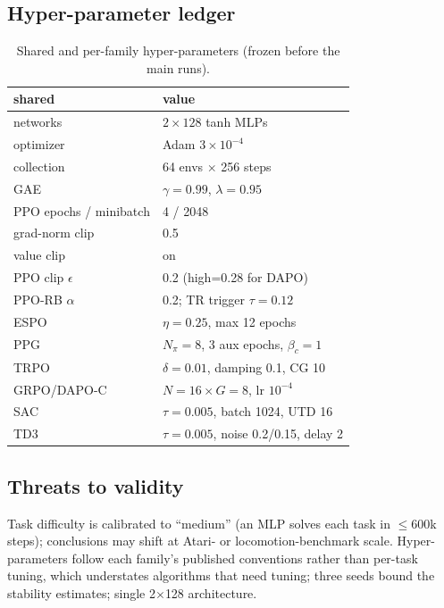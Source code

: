 \documentclass[journal,twoside]{IEEEtran}
\begin{document}
\subsection{Hyper-parameter ledger}
\begin{table}[t]
\centering\small
\caption{Shared and per-family hyper-parameters (frozen before the main
runs).}
\label{tab:hparams}
\begin{tabular}{ll}
\toprule
shared & value \\
\midrule
networks & $2{\times}128$ tanh MLPs \\
optimizer & Adam $3{\times}10^{-4}$ \\
collection & 64 envs $\times$ 256 steps \\
GAE & $\gamma=0.99$, $\lambda=0.95$ \\
PPO epochs / minibatch & 4 / 2048 \\
grad-norm clip & 0.5 \\
value clip & on \\
\midrule
PPO clip $\epsilon$ & 0.2 (high=0.28 for DAPO) \\
PPO-RB $\alpha$ & 0.2; TR trigger $\tau{=}0.12$ \\
ESPO & $\eta{=}0.25$, max 12 epochs \\
PPG & $N_\pi{=}8$, 3 aux epochs, $\beta_c{=}1$ \\
TRPO & $\delta{=}0.01$, damping 0.1, CG 10 \\
GRPO/DAPO-C & $N{=}16\times G{=}8$, lr $10^{-4}$ \\
SAC & $\tau{=}0.005$, batch 1024, UTD 16 \\
TD3 & $\tau{=}0.005$, noise 0.2/0.15, delay 2 \\
\bottomrule
\end{tabular}
\end{table}

\subsection{Threats to validity}
Task difficulty is calibrated to ``medium'' (an MLP solves each task in
$\le$600k steps); conclusions may shift at Atari- or locomotion-benchmark
scale. Hyper-parameters follow each family's published conventions rather
than per-task tuning, which understates algorithms that need tuning;
three seeds bound the stability estimates; single 2$\times$128
architecture.
\end{document}
